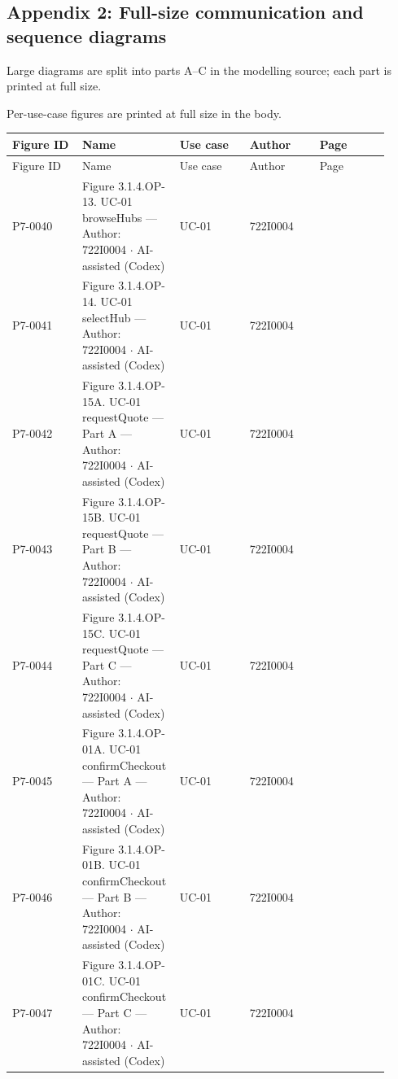 \subsection*{Appendix 2: Full-size communication and sequence diagrams}
Large diagrams are split into parts A--C in the modelling source; each part is printed at full size.

Per-use-case figures are printed at full size in the body.

\begin{longtable}{>{\raggedright\arraybackslash}p{0.1840\linewidth}>{\raggedright\arraybackslash}p{0.1840\linewidth}>{\raggedright\arraybackslash}p{0.1840\linewidth}>{\raggedright\arraybackslash}p{0.1840\linewidth}>{\raggedright\arraybackslash}p{0.1840\linewidth}}
Figure ID & Name & Use case & Author & Page \\
\hline\endfirsthead
Figure ID & Name & Use case & Author & Page \\
\hline\endhead
P7-0040 & Figure 3.1.4.OP-13. UC-01 browseHubs --- Author: 722I0004 \ensuremath{\cdot} AI-assisted (Codex) & UC-01 & 722I0004 & \pageref{P7-0040} \\
P7-0041 & Figure 3.1.4.OP-14. UC-01 selectHub --- Author: 722I0004 \ensuremath{\cdot} AI-assisted (Codex) & UC-01 & 722I0004 & \pageref{P7-0041} \\
P7-0042 & Figure 3.1.4.OP-15A. UC-01 requestQuote --- Part A --- Author: 722I0004 \ensuremath{\cdot} AI-assisted (Codex) & UC-01 & 722I0004 & \pageref{P7-0042} \\
P7-0043 & Figure 3.1.4.OP-15B. UC-01 requestQuote --- Part B --- Author: 722I0004 \ensuremath{\cdot} AI-assisted (Codex) & UC-01 & 722I0004 & \pageref{P7-0043} \\
P7-0044 & Figure 3.1.4.OP-15C. UC-01 requestQuote --- Part C --- Author: 722I0004 \ensuremath{\cdot} AI-assisted (Codex) & UC-01 & 722I0004 & \pageref{P7-0044} \\
P7-0045 & Figure 3.1.4.OP-01A. UC-01 confirmCheckout --- Part A --- Author: 722I0004 \ensuremath{\cdot} AI-assisted (Codex) & UC-01 & 722I0004 & \pageref{P7-0045} \\
P7-0046 & Figure 3.1.4.OP-01B. UC-01 confirmCheckout --- Part B --- Author: 722I0004 \ensuremath{\cdot} AI-assisted (Codex) & UC-01 & 722I0004 & \pageref{P7-0046} \\
P7-0047 & Figure 3.1.4.OP-01C. UC-01 confirmCheckout --- Part C --- Author: 722I0004 \ensuremath{\cdot} AI-assisted (Codex) & UC-01 & 722I0004 & \pageref{P7-0047} \\

\end{longtable}
